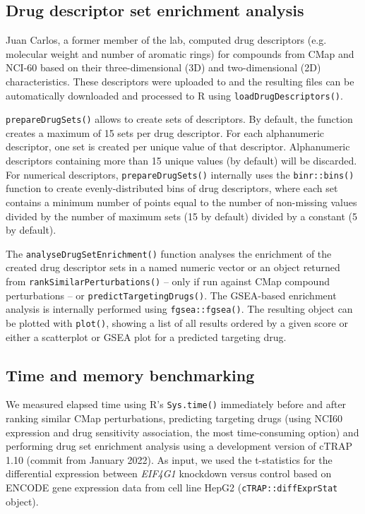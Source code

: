 \subsection{Drug descriptor set enrichment analysis}

Juan Carlos, a former member of the lab, computed drug descriptors (e.g. molecular weight and number of aromatic rings) for compounds from CMap and NCI-60 based on their three-dimensional (3D) and two-dimensional (2D) characteristics. These descriptors were uploaded to  and the resulting files can be automatically downloaded and processed to R using \texttt{loadDrugDescriptors()}.

\texttt{prepareDrugSets()} allows to create sets of descriptors. By default, the function creates a maximum of 15 sets per drug descriptor. For each alphanumeric descriptor, one set is created per unique value of that descriptor. Alphanumeric descriptors containing more than 15 unique values (by default) will be discarded. For numerical descriptors, \texttt{prepareDrugSets()} internally uses the \texttt{binr::bins()} function to create evenly-distributed bins of drug descriptors, where each set contains a minimum number of points equal to the number of non-missing values divided by the number of maximum sets (15 by default) divided by a constant (5 by default).

The \texttt{analyseDrugSetEnrichment()} function analyses the enrichment of the created drug descriptor sets in a named numeric vector or an object returned from \texttt{rankSimilarPerturbations()} – only if run against CMap compound perturbations – or \texttt{predictTargetingDrugs()}. The GSEA-based enrichment analysis is internally performed using \texttt{fgsea::fgsea()}. The resulting object can be plotted with \texttt{plot()}, showing a list of all results ordered by a given score or either a scatterplot or GSEA plot for a predicted targeting drug.

\subsection{Time and memory benchmarking}

We measured elapsed time using R’s \texttt{Sys.time()} immediately before and after ranking similar CMap perturbations, predicting targeting drugs (using NCI60 expression and drug sensitivity association, the most time-consuming option) and performing drug set enrichment analysis using a development version of cTRAP 1.10 (commit  from January 2022). As input, we used the t-statistics for the differential expression between \emph{EIF4G1} knockdown versus control based on ENCODE gene expression data from cell line HepG2 (\texttt{cTRAP::diffExprStat} object).


